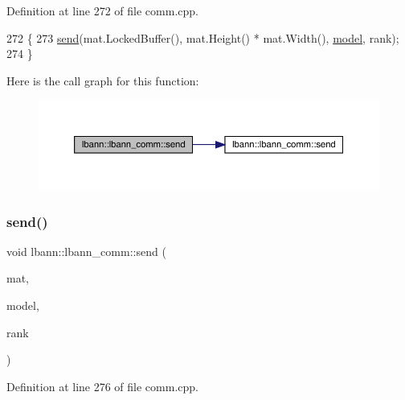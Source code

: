 Definition at line 272 of file comm.\+cpp.


\begin{DoxyCode}
272                                                          \{
273   \hyperlink{classlbann_1_1lbann__comm_a086078b881e7250df140ac116adb1939}{send}(mat.LockedBuffer(), mat.Height() * mat.Width(), \hyperlink{namespacelbann_adee41f31f15f3906cbdcce4a1417eb56a20f35e630daf44dbfa4c3f68f5399d8c}{model}, rank);
274 \}
\end{DoxyCode}
Here is the call graph for this function\+:\nopagebreak
\begin{figure}[H]
\begin{center}
\leavevmode
\includegraphics[width=350pt]{classlbann_1_1lbann__comm_ac3fa03c3ee8351daed6c7a5fd6f8535d_cgraph}
\end{center}
\end{figure}
\mbox{\label{classlbann_1_1lbann__comm_ae6ad297cccfc9ed893b855046d60b34d}} 
\subsubsection{\texorpdfstring{send()}{send()}\hspace{0.1cm}{\footnotesize\ttfamily [4/6]}}
{\footnotesize\ttfamily void lbann\+::lbann\+\_\+comm\+::send (\begin{DoxyParamCaption}\item[{const \hyperlink{base_8hpp_a0fab5387556805cfeac3e7e567bf66c5}{Dist\+Mat} \&}]{mat,  }\item[{int}]{model,  }\item[{int}]{rank }\end{DoxyParamCaption})}



Definition at line 276 of file comm.\+cpp.


